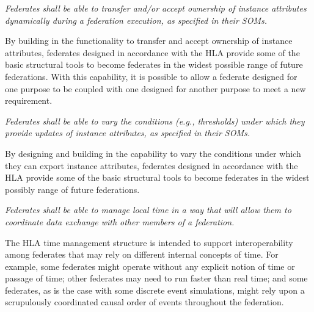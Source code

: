 \vspace{4.5pt}

\textit{Federates shall be able to transfer and/or accept ownership of instance attributes dynamically during a\linebreak
federation execution, as specified in their SOMs.}

\vspace{6.1pt}
By building in the functionality to transfer and accept ownership of instance attributes, federates designed in\linebreak
accordance with the HLA provide some of the basic structural tools to become federates in the widest\linebreak
possible range of future federations. With this capability, it is possible to allow a federate designed for one\linebreak
purpose to be coupled with one designed for another purpose to meet a new requirement.

\vspace{4.5pt}

\textit{Federates shall be able to vary the conditions (e.g., thresholds) under which they provide updates of\linebreak
instance attributes, as specified in their SOMs.}

\vspace{6.1pt}
By designing and building in the capability to vary the conditions under which they can export instance\linebreak
attributes, federates designed in accordance with the HLA provide some of the basic structural tools to\linebreak
become federates in the widest possibly range of future federations.

\vspace{4.5pt}

\textit{Federates shall be able to manage local time in a way that will allow them to coordinate data exchange with\linebreak
other members of a federation.}

\vspace{6.1pt}
The HLA time management structure is intended to support interoperability among federates that may rely\linebreak
on different internal concepts of time. For example, some federates might operate without any explicit\linebreak
notion of time or passage of time; other federates may need to run faster than real time; and some federates,\linebreak
as is the case with some discrete event simulations, might rely upon a scrupulously coordinated causal order\linebreak
of events throughout the federation.

